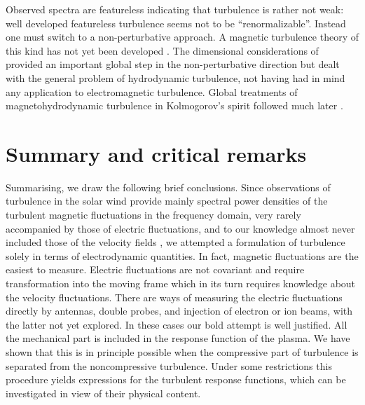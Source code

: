 \documentclass[ ]{copernicus2}
\begin{document}
{{{{Observed spectra are featureless indicating that turbulence is rather not weak: well developed featureless turbulence seems not to be ``renormalizable''. Instead one must switch to a non-perturbative approach. A magnetic turbulence theory of this kind has not yet been developed \citep[for review of some attempts cf.,][]{verma2004}. The dimensional considerations of \citet{kolmogorov1941} provided an important global step in the non-perturbative direction but dealt with the general problem of hydrodynamic turbulence, not having had in mind any application to  electromagnetic turbulence. Global treatments of magnetohydrodynamic turbulence in Kolmogorov's spirit followed much later \citep[cf.,][and others]{iroshnikov1963,kraichnan1964}.} 

\section{{Summary and critical remarks}}
{Summarising, we draw the following brief conclusions. Since observations of turbulence in the solar wind provide mainly spectral power densities of the turbulent magnetic fluctuations in the frequency domain, very rarely accompanied by those of electric fluctuations, and to our knowledge almost never included those of the velocity fields {\citep[cf.,][for preliminary observations]{podesta2006}}, we attempted a formulation of turbulence solely in terms of electrodynamic quantities. In fact, magnetic fluctuations are the easiest to measure. Electric fluctuations are not covariant and require transformation into the moving frame which in its turn requires knowledge about the velocity fluctuations. There are ways of measuring the electric fluctuations directly by antennas, double probes, and injection of electron or ion beams, with the latter not yet explored. In these cases our bold attempt is well justified. All the mechanical part is included in the response function of the plasma. We have shown that this is in principle possible when the compressive part of turbulence is separated from the noncompressive turbulence. Under some restrictions this procedure yields expressions for the turbulent response functions, which can be investigated in view of their physical content.}

}}}
\end{document}
